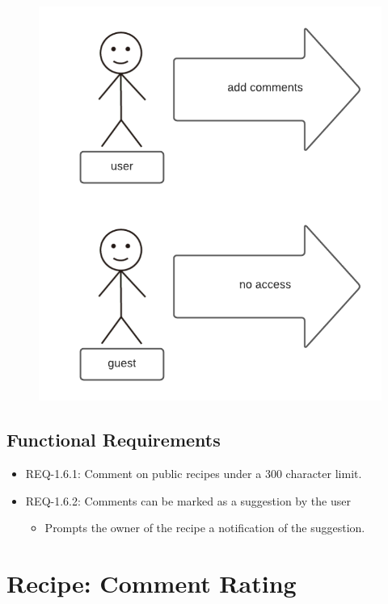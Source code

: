 \documentclass{scrreprt}
\begin{document}
\begin{figure}[H]\centering
    \includegraphics[width=\columnwidth]{response diagrams/Comments.png}
\end{figure}

\subsection{\gls{Functional Requirements}}

\begin{itemize}
    \item REQ-1.6.1: Comment on public recipes under a 300 character limit.
    \item REQ-1.6.2: Comments can be marked as a suggestion by the user
          \begin{itemize}
              \item Prompts the owner of the recipe a notification of the suggestion.
          \end{itemize}
\end{itemize}

\section{Recipe: Comment Rating}
\end{document}
